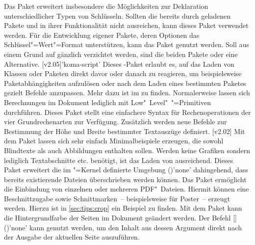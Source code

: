 \begin{DeclarePackages}
  Das Paket  erweitert insbesondere die Möglichkeiten zur 
  Deklaration unterschiedlicher Typen von Schlüsseln. Sollten die bereits durch 
  \TUDScript geladenen Pakete  und  in ihrer 
  Funktionalität nicht ausreichen, kann dieses Paket verwendet werden. Für die 
  Entwicklung eigener Pakete, deren Optionen das Schlüssel"=Wert"=Format 
  unterstützen, kann das Paket  genutzt werden. Soll aus einem 
  Grund auf \KOMAScript{} gänzlich verzichtet werden, sind die beiden Pakete 
   oder  eine Alternative.
[v2.05]'koma-script'
  Dieses \KOMAScript-Paket erlaubt es, auf das Laden von Klassen oder Paketen 
  direkt davor oder danach zu reagieren, um beispielsweise Paketabhängigkeiten 
  aufzulösen oder nach dem Laden eines bestimmten Paketes gezielt Befehle 
  anzupassen. Mehr dazu ist im \scrguide zu finden.
  Normalerweise lassen sich Berechnungen im Dokument lediglich mit 
  Low"~Level"~"=Primitiven durchführen. Dieses Paket stellt eine 
  einfachere Syntax für Rechenoperationen der vier Grundrechenarten zur 
  Verfügung. Zusätzlich werden neue Befehle zur Bestimmung der Höhe und Breite 
  bestimmter Textauszüge definiert.
[v2.02]
  Mit dem Paket  lassen sich sehr einfach Minimalbeispiele 
  erzeugen, die sowohl Blindtexte als auch Abbildungen enthalten sollen. Werden 
  keine Grafiken sondern lediglich Textabschnitte etc. benötigt, ist das Laden 
  von  ausreichend.
  Dieses Paket erweitert die im "=Kernel definierte Umgebung 
  ()'none' dahingehend,
  dass bereits existierende Dateien überschrieben werden können.
  Das Paket ermöglicht die Einbindung von einzelnen oder mehreren PDF"~Dateien.
  Hiermit können eine Beschnittzugabe sowie Schnittmarken~-- beispielsweise für 
  Poster~-- erzeugt werden. Hierzu ist in \autoref{sec:tips:crop} ein Beispiel 
  zu finden.
  Mit dem Paket kann die Hintergrundfarbe der Seiten im Dokument geändert 
  werden.
  Der Befehl [\MPValue{\dots}]()'none' 
  kann genutzt werden, um den Inhalt aus dessen Argument direkt nach der 
  Ausgabe der aktuellen Seite auszuführen.

\end{DeclarePackages}
